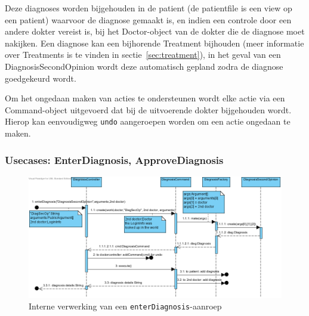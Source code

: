 \documentclass[a4paper]{article}
\begin{document}
Deze diagnoses worden bijgehouden in de patient (de patientfile is een view op een patient) waarvoor de diagnose gemaakt is, en indien een controle door een andere dokter vereist is, bij het Doctor-object van de dokter die de diagnose moet nakijken.
Een diagnose kan een bijhorende Treatment bijhouden (meer informatie over Treatments is te vinden in sectie~\ref{sec:treatment}), in het geval van een DiagnosisSecondOpinion wordt deze automatisch gepland zodra de diagnose goedgekeurd wordt.

Om het ongedaan maken van acties te ondersteunen wordt elke actie via een Command-object uitgevoerd dat bij de uitvoerende dokter bijgehouden wordt. Hierop kan eenvoudigweg \texttt{undo} aangeroepen worden om een actie ongedaan te maken.
\subsubsection{Usecases: EnterDiagnosis, ApproveDiagnosis}
\begin{figure}[h]
\centering
\includegraphics[width=\textwidth]{Pictures/EnterDiagnosis}
\caption{Interne verwerking van een \texttt{enterDiagnosis}-aanroep}
\label{fig:enterdiagnosis}
\end{figure}
\end{document}
